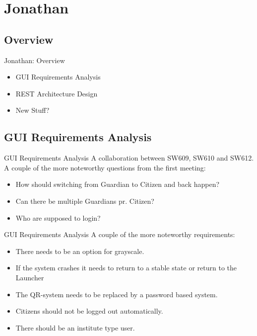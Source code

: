 \section{Jonathan}
\subsection{Overview}
\begin{frame}{Jonathan: Overview}
\begin{itemize}
\item GUI Requirements Analysis
\item REST Architecture Design
\item New Stuff?
\end{itemize}
\end{frame}

\subsection{GUI Requirements Analysis}
\begin{frame}{GUI Requirements Analysis}
A collaboration between SW609, SW610 and SW612.\\

A couple of the more noteworthy questions from the first meeting:
\begin{itemize}
\item How should switching from Guardian to Citizen and back happen?
\item Can there be multiple Guardians pr. Citizen?
\item Who are supposed to login?
\end{itemize}

\end{frame}

\begin{frame}[fragile]{GUI Requirements Analysis}
A couple of the more noteworthy requirements:

\begin{itemize}
\item There needs to be an option for grayscale.
\item If the system crashes it needs to return to a stable state or return to the Launcher
\item The QR-system needs to be replaced by a password based system.
\item Citizens should not be logged out automatically.
\item There should be an institute type user.
\end{itemize}

\end{frame}

